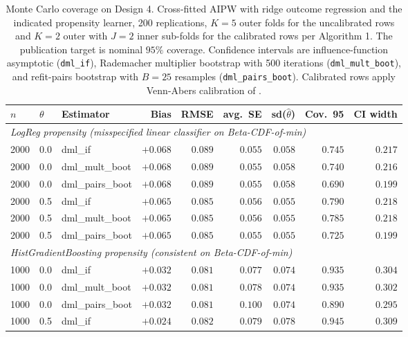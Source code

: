 
\begin{table}[H]
\centering
\caption{Monte Carlo coverage on \citet{ballinari2024improving}
Design 4. Cross-fitted AIPW with ridge outcome regression and the
indicated propensity learner, 200 replications, $K{=}5$ outer folds
for the uncalibrated rows and $K{=}2$ outer with $J{=}2$ inner
sub-folds for the calibrated rows per \citeauthor{ballinari2024improving}
Algorithm 1.  The publication target is nominal $95\%$ coverage.
Confidence intervals are influence-function asymptotic
(\texttt{dml\_if}), Rademacher multiplier bootstrap with 500
iterations (\texttt{dml\_mult\_boot}), and refit-pairs bootstrap with
$B{=}25$ resamples (\texttt{dml\_pairs\_boot}).  Calibrated rows
apply Venn-Abers calibration of \citet{vovk2015large}.}
\label{tab:sim-coverage}
\small
\begin{tabular}{lllrrrrrr}
\toprule
$n$ & $\theta$ & Estimator & Bias & RMSE & avg.~SE & sd($\hat\theta$) & Cov.\ 95 & CI width \\
\midrule
\multicolumn{9}{l}{\emph{LogReg propensity (misspecified linear classifier on Beta-CDF-of-min)}} \\
2000 & 0.0 & dml\_if         & $+0.068$ & $0.089$ & $0.055$ & $0.058$ & $0.745$ & $0.217$ \\
2000 & 0.0 & dml\_mult\_boot & $+0.068$ & $0.089$ & $0.055$ & $0.058$ & $0.740$ & $0.216$ \\
2000 & 0.0 & dml\_pairs\_boot & $+0.068$ & $0.089$ & $0.055$ & $0.058$ & $0.690$ & $0.199$ \\
2000 & 0.5 & dml\_if         & $+0.065$ & $0.085$ & $0.056$ & $0.055$ & $0.790$ & $0.218$ \\
2000 & 0.5 & dml\_mult\_boot & $+0.065$ & $0.085$ & $0.056$ & $0.055$ & $0.785$ & $0.218$ \\
2000 & 0.5 & dml\_pairs\_boot & $+0.065$ & $0.085$ & $0.055$ & $0.055$ & $0.725$ & $0.199$ \\
\midrule
\multicolumn{9}{l}{\emph{HistGradientBoosting propensity (consistent on Beta-CDF-of-min)}} \\
1000 & 0.0 & dml\_if         & $+0.032$ & $0.081$ & $0.077$ & $0.074$ & $0.935$ & $0.304$ \\
1000 & 0.0 & dml\_mult\_boot & $+0.032$ & $0.081$ & $0.078$ & $0.074$ & $0.935$ & $0.302$ \\
1000 & 0.0 & dml\_pairs\_boot & $+0.032$ & $0.081$ & $0.100$ & $0.074$ & $0.890$ & $0.295$ \\
1000 & 0.5 & dml\_if         & $+0.024$ & $0.082$ & $0.079$ & $0.078$ & $0.945$ & $0.309$ \\

\end{tabular}
\end{table}
